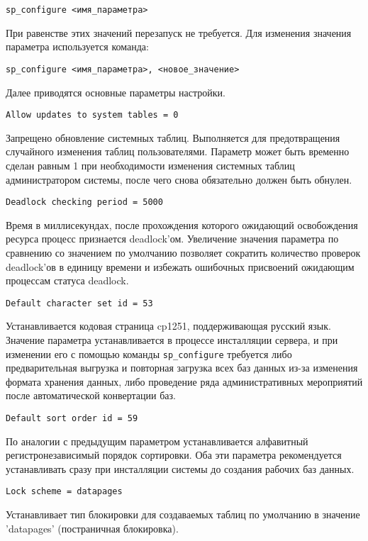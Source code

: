 \verb|sp_configure <имя_параметра>|\par\bigskip

При равенстве этих значений перезапуск не требуется. Для изменения значения параметра используется команда:

\verb|sp_configure <имя_параметра>, <новое_значение>|\par\bigskip

Далее приводятся основные параметры настройки.\par\bigskip

\verb|Allow updates to system tables = 0|

Запрещено обновление системных таблиц. Выполняется для предотвращения случайного изменения таблиц пользователями. Параметр может быть временно сделан равным 1 при необходимости изменения системных таблиц администратором системы, после чего снова обязательно должен быть обнулен.\par\bigskip

\verb|Deadlock checking period = 5000|

Время в миллисекундах, после прохождения которого ожидающий освобождения ресурса процесс признается deadlock'ом. Увеличение значения параметра по сравнению со значением по умолчанию позволяет сократить количество проверок deadlock'ов в единицу времени и избежать ошибочных присвоений ожидающим процессам статуса deadlock.\par\bigskip

\verb|Default character set id = 53|

Устанавливается кодовая страница cp1251, поддерживающая русский язык. Значение параметра устанавливается в процессе инсталляции сервера, и при изменении его с помощью команды \verb|sp_configure| требуется либо предварительная выгрузка и повторная загрузка всех баз данных из-за изменения формата хранения данных, либо проведение ряда административных мероприятий после автоматической конвертации баз.\par\bigskip

\verb|Default sort order id = 59|

По аналогии с предыдущим параметром устанавливается алфавитный регистронезависимый порядок сортировки. Оба эти параметра рекомендуется устанавливать сразу при инсталляции системы до создания рабочих баз данных.\par\bigskip

\verb|Lock scheme = datapages|

Устанавливает тип блокировки для создаваемых таблиц по умолчанию в значение 'datapages' (постраничная блокировка).\par\bigskip

